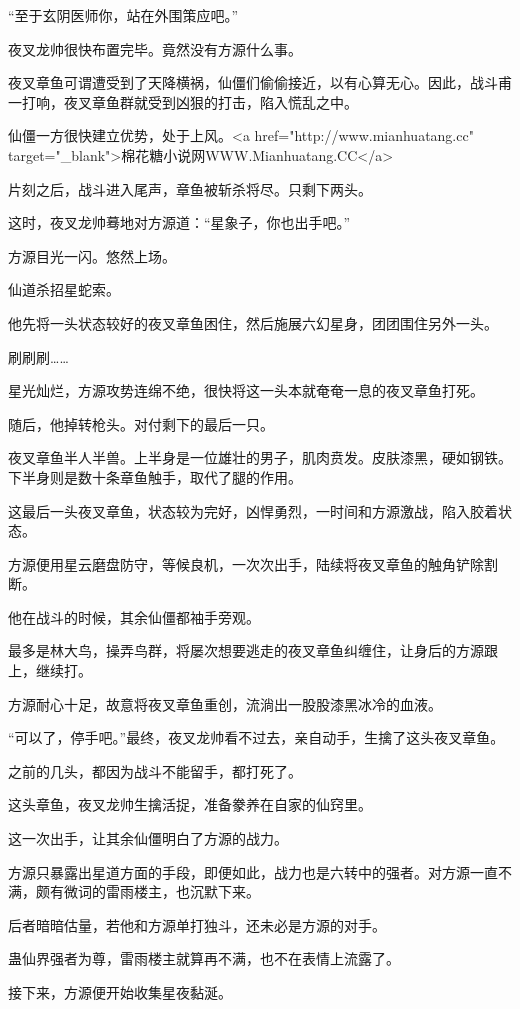\begin{this_body}
“至于玄阴医师你，站在外围策应吧。”

夜叉龙帅很快布置完毕。竟然没有方源什么事。

夜叉章鱼可谓遭受到了天降横祸，仙僵们偷偷接近，以有心算无心。因此，战斗甫一打响，夜叉章鱼群就受到凶狠的打击，陷入慌乱之中。

仙僵一方很快建立优势，处于上风。<a href="http://www.mianhuatang.cc" target="\_blank">棉花糖小说网WWW.Mianhuatang.CC</a>

片刻之后，战斗进入尾声，章鱼被斩杀将尽。只剩下两头。

这时，夜叉龙帅蓦地对方源道：“星象子，你也出手吧。”

方源目光一闪。悠然上场。

仙道杀招星蛇索。

他先将一头状态较好的夜叉章鱼困住，然后施展六幻星身，团团围住另外一头。

刷刷刷……

星光灿烂，方源攻势连绵不绝，很快将这一头本就奄奄一息的夜叉章鱼打死。

随后，他掉转枪头。对付剩下的最后一只。

夜叉章鱼半人半兽。上半身是一位雄壮的男子，肌肉贲发。皮肤漆黑，硬如钢铁。下半身则是数十条章鱼触手，取代了腿的作用。

这最后一头夜叉章鱼，状态较为完好，凶悍勇烈，一时间和方源激战，陷入胶着状态。

方源便用星云磨盘防守，等候良机，一次次出手，陆续将夜叉章鱼的触角铲除割断。

他在战斗的时候，其余仙僵都袖手旁观。

最多是林大鸟，操弄鸟群，将屡次想要逃走的夜叉章鱼纠缠住，让身后的方源跟上，继续打。

方源耐心十足，故意将夜叉章鱼重创，流淌出一股股漆黑冰冷的血液。

“可以了，停手吧。”最终，夜叉龙帅看不过去，亲自动手，生擒了这头夜叉章鱼。

之前的几头，都因为战斗不能留手，都打死了。

这头章鱼，夜叉龙帅生擒活捉，准备豢养在自家的仙窍里。

这一次出手，让其余仙僵明白了方源的战力。

方源只暴露出星道方面的手段，即便如此，战力也是六转中的强者。对方源一直不满，颇有微词的雷雨楼主，也沉默下来。

后者暗暗估量，若他和方源单打独斗，还未必是方源的对手。

蛊仙界强者为尊，雷雨楼主就算再不满，也不在表情上流露了。

接下来，方源便开始收集星夜黏涎。


\end{this_body}
